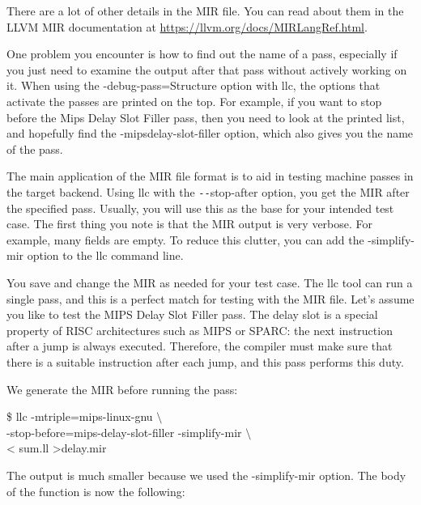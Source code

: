 There are a lot of other details in the MIR file. You can read about them in the LLVM MIR documentation at \url{https://llvm.org/docs/MIRLangRef.html}.\par

One problem you encounter is how to find out the name of a pass, especially if you just need to examine the output after that pass without actively working on it. When using the -debug-pass=Structure option with llc, the options that activate the passes are printed on the top. For example, if you want to stop before the Mips Delay Slot Filler pass, then you need to look at the printed list, and hopefully find the -mipsdelay-slot-filler option, which also gives you the name of the pass.\par

The main application of the MIR file format is to aid in testing machine passes in the target backend. Using llc with the \verb|--|stop-after option, you get the MIR after the specified pass. Usually, you will use this as the base for your intended test case. The first thing you note is that the MIR output is very verbose. For example, many fields are empty. To reduce this clutter, you can add the -simplify-mir option to the llc command line.\par

You save and change the MIR as needed for your test case. The llc tool can run a single pass, and this is a perfect match for testing with the MIR file. Let's assume you like to test the MIPS Delay Slot Filler pass. The delay slot is a special property of RISC architectures such as MIPS or SPARC: the next instruction after a jump is always executed. Therefore, the compiler must make sure that there is a suitable instruction after each jump, and this pass performs this duty.\par

We generate the MIR before running the pass:\par

\begin{tcolorbox}[colback=white,colframe=black]
\$ llc -mtriple=mips-linux-gnu $\setminus$ \\
\hspace*{2cm}-stop-before=mips-delay-slot-filler -simplify-mir $\setminus$ \\
\hspace*{2cm}< sum.ll >delay.mir
\end{tcolorbox}

The output is much smaller because we used the -simplify-mir option. The body of the function is now the following:\par

